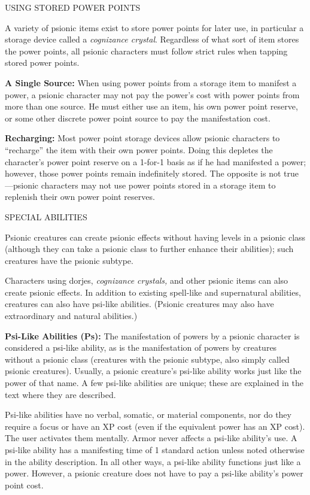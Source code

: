 \documentclass{article}
\begin{document}
\vspace{12pt}
USING STORED POWER POINTS

A variety of psionic items exist to store power points for later use, in particular 
a storage device called a \textit{cognizance crystal}. Regardless of what sort 
of item stores the power points, all psionic characters must follow strict rules 
when tapping stored power points.

\textbf{A Single Source: }When using power points from a storage item to manifest 
a power, a psionic character may not pay the power's cost with power points from 
more than one source. He must either use an item, his own power point reserve, 
or some other discrete power point source to pay the manifestation cost. 

\textbf{Recharging: }Most power point storage devices allow psionic characters 
to ``recharge'' the item with their own power points. Doing this depletes the character's 
power point reserve on a 1-for-1 basis as if he had manifested a power; however, 
those power points remain indefinitely stored. The opposite is not true---psionic 
characters may not use power points stored in a storage item to replenish their 
own power point reserves.

\vspace{12pt}
{\LARGE{}SPECIAL ABILITIES}

Psionic creatures can create psionic effects without having levels in a psionic 
class (although they can take a psionic class to further enhance their abilities); 
such creatures have the psionic subtype.

Characters using dorjes, \textit{cognizance crystals, }and other psionic items 
can also create psionic effects. In addition to existing spell-like and supernatural 
abilities, creatures can also have psi-like abilities. (Psionic creatures may also 
have extraordinary and natural abilities.)

\textbf{Psi-Like Abilities (Ps):} The manifestation of powers by a psionic character 
is considered a psi-like ability, as is the manifestation of powers by creatures 
without a psionic class (creatures with the psionic subtype, also simply called 
psionic creatures). Usually, a psionic creature's psi-like ability works just like 
the power of that name. A few psi-like abilities are unique; these are explained 
in the text where they are described.

Psi-like abilities have no verbal, somatic, or material components, nor do they 
require a focus or have an XP cost (even if the equivalent power has an XP cost). 
The user activates them mentally. Armor never affects a psi-like ability's use. 
A psi-like ability has a manifesting time of 1 standard action unless noted otherwise 
in the ability description. In all other ways, a psi-like ability functions just 
like a power. However, a psionic creature does not have to pay a psi-like ability's 
power point cost.
\end{document}
